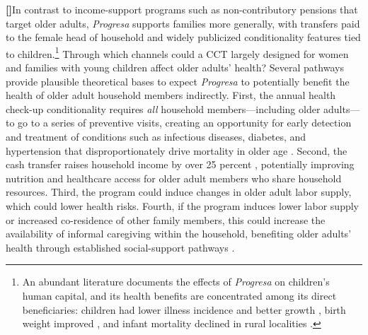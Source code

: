 \documentclass[12pt]{article}
\newcounter{paragraphnum}
\newcommand{\p}{\refstepcounter{paragraphnum}\textbf{[\theparagraphnum]}\enspace}
\begin{document}
\p In contrast to income-support programs such as non-contributory pensions that target older adults, \textit{Progresa} supports families more generally, with transfers paid to the female head of household and widely publicized conditionality features tied to children.\footnote{An abundant literature documents the effects of \textit{Progresa} on children's human capital, and its health benefits are concentrated among its direct beneficiaries: children had lower illness incidence and better growth \citep{Gertler2004AER, Rivera2004JAMA, Fernald2008Lancet}, birth weight improved \citep{BarberGertler2008TMIH}, and infant mortality declined in rural localities \citep{Barham2011JDE}.}  Through which channels could a CCT largely designed for women and families with young children affect older adults' health? Several pathways provide plausible theoretical bases to expect \textit{Progresa} to potentially benefit the health of older adult household members indirectly. First, the annual health check-up conditionality requires \textit{all} household members—including older adults—to go to a series of preventive visits, creating an opportunity for early detection and treatment of conditions such as infectious diseases, diabetes, and hypertension that disproportionately drive mortality in older age \citep{Angel2017Gerontologist, aguila2024conditional}. Second, the cash transfer raises household income by over 25 percent \citep{Gertler2004AER, ParkerTodd2017JEL}, potentially improving nutrition and healthcare access for older adult members who share household resources. Third, the program could induce changes in older adult labor supply, which could lower health risks. Fourth, if the program induces lower labor supply or increased co-residence of other family members, this could increase the availability of informal caregiving within the household, benefiting older adults' health through established social-support pathways \citep{duflo2000child, BehrmanParker2013Demography}. 
\end{document}
